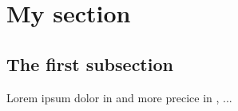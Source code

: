 \usepackage{prettyref}

\section{My section}
\label{sec:section1}

\subsection{The first subsection}
\label{ssec:subsec1}

Lorem ipsum dolor in  and more precice in
, ...
